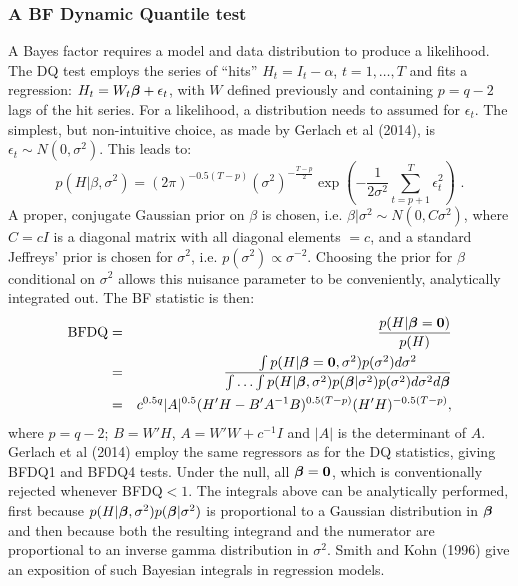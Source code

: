 \documentclass[12pt,epsf]{article}
\newcommand{\utwi}[1]{\mbox{\boldmath $ #1$}}
\begin{document}
\subsubsection{A BF Dynamic Quantile test}
A Bayes factor requires a model and data distribution to produce a likelihood. The DQ test employs the series of
``hits'' $H_t = I_{t}-\alpha$, $t=1,\ldots,T$ and fits a regression: $ H_t = W_{t}\utwi{\beta} + \epsilon_t$, with $W$ defined previously and
containing $p=q-2$ lags of the hit series.
For a likelihood, a distribution needs to assumed for $\epsilon_t$. The simplest, but non-intuitive choice, as made by
Gerlach et al (2014), is $\epsilon_t \sim N(0,\sigma^2)$. This leads to:
$$
p(H|\beta,\sigma^2) = (2 \pi)^{-0.5(T-p)} (\sigma^2)^{-\frac{T-p}{2}} \exp\left( -\frac{1}{2\sigma^2} \sum_{t=p+1}^T \epsilon_t^2\right)
\,\, .
$$
A proper, conjugate Gaussian prior on $\beta$ is chosen, i.e. $\beta|\sigma^2 \sim N(0,C \sigma^2)$, where $C =cI$ is a diagonal matrix
with all diagonal elements $=c$, and a standard Jeffreys' prior is chosen for $\sigma^2$, i.e. $p(\sigma^2) \propto \sigma^{-2}$.
Choosing the prior for $\beta$ conditional on $\sigma^2$ allows this nuisance parameter to be
conveniently, analytically integrated out. The BF statistic is then:
\begin{eqnarray*}
\mbox{BFDQ} &=& \frac{p(H|\utwi{\beta}={\bf 0})}{p(H)} \\
            &=& \frac{\int p(H|\utwi{\beta}={\bf 0},\sigma^2) p(\sigma^2) d \sigma^2}{\int \ldots \int p(H | \utwi{\beta},\sigma^2)p(\utwi{\beta}|\sigma^2) p(\sigma^2) d \sigma^2 d \utwi{\beta}} \\
            &=& c^{0.5q} |A|^{0.5} (H'H-B'A^{-1}B)^{0.5(T-p)}(H'H)^{-0.5(T-p)},
\end{eqnarray*}
where $p = q-2$; $B = W'H$, $A=W'W+c^{-1}I$ and $|A|$ is the determinant of $A$.
Gerlach et al (2014) employ the same regressors as for the DQ statistics, giving BFDQ1 and BFDQ4 tests. Under the null,
all $\utwi{\beta} = {\bf 0}$, which is conventionally rejected whenever BFDQ$<1$. The integrals above can be analytically performed, first
because $p(H | \utwi{\beta},\sigma^2)p(\utwi{\beta}|\sigma^2)$ is proportional to a Gaussian distribution in $\utwi{\beta}$ and then
because both the resulting integrand and the numerator are proportional to an inverse gamma distribution in $\sigma^2$.
Smith and Kohn (1996) give an exposition of such Bayesian integrals in regression models.
\end{document}
